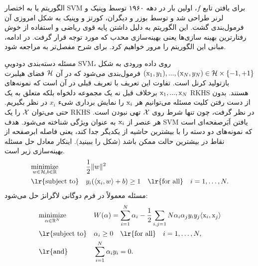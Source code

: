الگوریتم  یا به اختصار SVM برای یافتن تابع $f$، اولین بار در دهه ۱۹۶۰ توسط وپنیک و لرنر طراحی شد و توسط بوزر و دیگران، کورتز و وپنیک به شکل امروزی آن فرمول‌بندی گشت. این الگوریتم به دلیل داشتن پایه قوی ریاضی و استفاده از خوش رفتارترین بهینه سازی‌ها یعنی بهینه‌سازی‌ محدب که مورد توجه قرار گرفت. در ادامه، مبانی این الگوریتم را مرور خواهیم کرد. برای شرح مفصل‌تر به  مراجعه شود.

مسئله دسته‌بندی دودوییِ SVM، روی داده ورودی به شکل 
$(\mathrm{x}_1,y_1),...,(\mathrm{x}_N,y_N) \in \mathcal{H}\times\left\lbrace -1,+1 \right\rbrace$
 فرمول‌بندی می‌شود که در آن $\mathcal{H}$ فضای هیلبرت بازتولید کرنل است. تفاوت این تعریف با تعریف قبلی در آن است که نمونه‌های $\mathrm{x}_1,...,\mathrm{x}_N$ برخلاف قبل نه یک مجموعه دلخواه بلکه متعلق به یک RKHS هستند. بدون از دست رفتن کلیت مسئله می‌توانیم هر $\mathrm{x}_i$ را نمایش برداری شیء $x_i$ در نظر بگیریم. حتی می‌توان $\mathcal{X}$ را یک RKHS در نظر گرفت، چون تنها شرط روی $\mathcal{X}$ تهی نبودن است. هر عنصر از $\mathrm{x}_i$ به عنوان ویژگی شناخته می‌شود. هدف SVM یافتن اَبَرصفحه‌ای است که نمونه‌های دو دسته را با بیشترین حاشیه از یکدیگر جدا کند، یعنی فاصله ابرصفحه از نقاط در بیشترین حالت ممکن باشد (شکل  را ببینید). اینکار معادل حل مسئله بهینه‌سازی زیر است.
\begin{equation}\label{eq:svm-normal-form}
\begin{aligned}
& \underset{w \in \mH, b \in \R}{\text{minimize}} & & \dfrac{1}{2} \|w\|^2 \\
& \text{\lr{subject to}} & & y_i(\langle \mx_i,w \rangle + b) \geq 1 \quad\text{\lr{for all}}\quad i = 1, \ldots ,N.
\end{aligned}
\end{equation}
مسئله  معمولاً در فرم دوگانی لاگرانژ حل می‌شود:
\begin{equation}\label{eq:svm-dual-form}
\begin{aligned}
& \underset{\alpha \in \R^N}{\text{minimize}} & & W(\alpha)=\sum_{i=1}^{N}\alpha_i - \dfrac{1}{2} \sum_{i,j=1}{N} \alpha_i \alpha_j y_i y_j \langle \mx_i,\mx_j \rangle \\
& \text{\lr{subject to}} & & \alpha_i \geq 0 \quad\text{\lr{for all}}\quad i = 1, \ldots ,N, \\
& \text{\lr{and}} & & \sum_{i=1}^{N} \alpha_i y_i = 0.
\end{aligned}
\end{equation}
